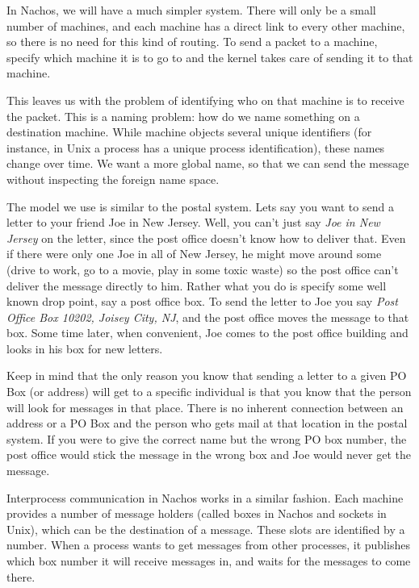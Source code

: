 In Nachos, we will have a much simpler system.  There will only be a
small number of machines, and each machine has a direct link to every
other machine, so there is no need for this kind of routing.  To send a
packet to a machine, specify which machine it is to go to and the
kernel takes care of sending it to that machine.

This leaves us with the problem of identifying who on that
machine is to receive the packet.  This is a naming problem: how do we
name something on a destination machine.  While machine objects
several unique identifiers (for instance, in Unix a process has a
unique process identification), these names change over time.
We want a more global name, so that we can send the message without
inspecting the foreign name space.

The model we use is similar to the postal system.  Lets say you want to
send a letter to your friend Joe in New Jersey.  Well, you
can't just say {\it Joe in New Jersey} on the letter, since the post office
doesn't know how to deliver that.  Even if there were only one Joe in all of
New Jersey, he might move around some (drive to work, go to a movie, play
in some toxic waste) so the post office can't deliver the message directly
to him.  Rather what you do is specify some well known drop point, say
a post office box.  To send the letter to Joe you say 
{\it Post Office Box 10202, Joisey City, NJ}, 
and the post office moves the message to that box.  Some time
later, when convenient, Joe comes to the post office building and looks
in his box for new letters.  

Keep in mind that the only reason you know that sending a letter to a given
PO Box (or address) will get to a specific individual is that you know that
the person will look for messages in that place.  There is no inherent
connection between an address or a PO Box and the person who gets mail
at that location in the postal system.  If you were to give the correct
name but the wrong PO box number, the post office would stick the message
in the wrong box and Joe would never get the message.

Interprocess communication in Nachos works in a similar fashion.  Each
machine provides a number of message holders (called boxes in Nachos
and sockets in Unix), which can be the destination of a message.  These
slots are identified by a number.  When a process wants to get messages
from other processes, it publishes which box number it will receive messages
in, and waits for the messages to come there.


